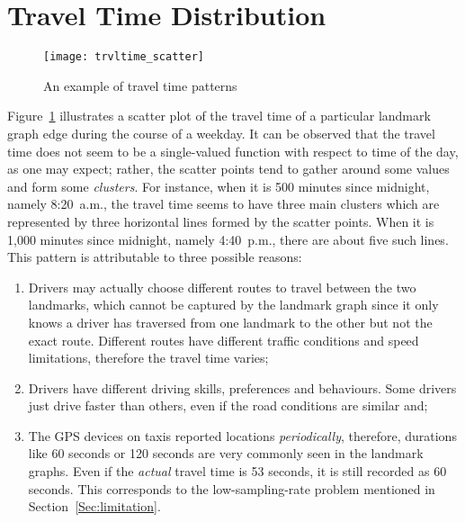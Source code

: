 \begin{table}[h!]
\centering
{}
\caption{An summary of landmark graphs}\label{Ta:ldmkgraphs}
\end{table}

\section{Travel Time Distribution}
\begin{figure}[h!]
\texttt{[image: trvltime\_scatter]}
\centering
\caption{An example of travel time patterns}\label{Fig:wrkd_50m_trvltime}
\end{figure}

Figure~\ref{Fig:wrkd_50m_trvltime} illustrates a scatter plot of the travel time of a particular landmark graph edge during the course of a weekday. It can be observed that the travel time does not seem to be a single-valued function with respect to time of the day, as one may expect; rather, the scatter points tend to gather around some values and form some \emph{clusters}. For instance, when it is 500 minutes since midnight, namely 8:20~a.m., the travel time seems to have three main clusters which are represented by three horizontal lines formed by the scatter points. When it is 1,000 minutes since midnight, namely 4:40~p.m., there are about five such lines. This pattern is attributable to three possible reasons:
\begin{enumerate}
\item Drivers may actually choose different routes to travel between the two landmarks, which cannot be captured by the landmark graph since it only knows a driver has traversed from one landmark to the other but not the exact route. Different routes have different traffic conditions and speed limitations, therefore the travel time varies;
\item Drivers have different driving skills, preferences and behaviours. Some drivers just drive faster than others, even if the road conditions are similar and;
\item The GPS devices on taxis reported locations \emph{periodically}, therefore, durations like 60 seconds or 120 seconds are very commonly seen in the landmark graphs. Even if the \emph{actual} travel time is 53 seconds, it is still recorded as 60 seconds. This corresponds to the low-sampling-rate problem mentioned in Section~\ref{Sec:limitation}. 
\end{enumerate}

